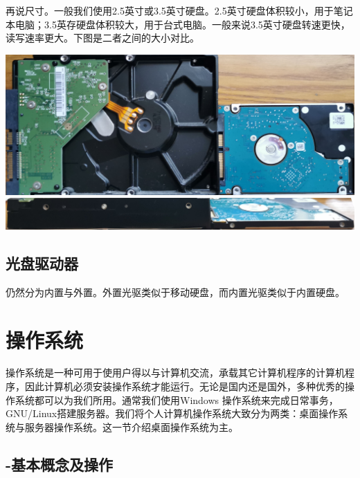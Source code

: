 再说尺寸。一般我们使用2.5英寸或3.5英寸硬盘。2.5英寸硬盘体积较小，用于笔记本电脑；3.5英存硬盘体积较大，用于台式电脑。一般来说3.5英寸硬盘转速更快，读写速率更大。下图是二者之间的大小对比。
\begin{center}
	\includegraphics[width=0.7\linewidth]{pic/HD2}\\\includegraphics[width=0.7\linewidth]{pic/HD3}	
\end{center} \par
\section{光盘驱动器}
仍然分为内置与外置。外置光驱类似于移动硬盘，而内置光驱类似于内置硬盘。
\chapter{操作系统}
操作系统是一种可用于使用户得以与计算机交流，承载其它计算机程序的计算机程序，因此计算机必须安装操作系统才能运行。无论是国内还是国外，多种优秀的操作系统都可以为我们所用。通常我们使用Windows 操作系统来完成日常事务，GNU/Linux搭建服务器。我们将个人计算机操作系统大致分为两类：桌面操作系统与服务器操作系统。这一节介绍桌面操作系统为主。
\section{-基本概念及操作}
